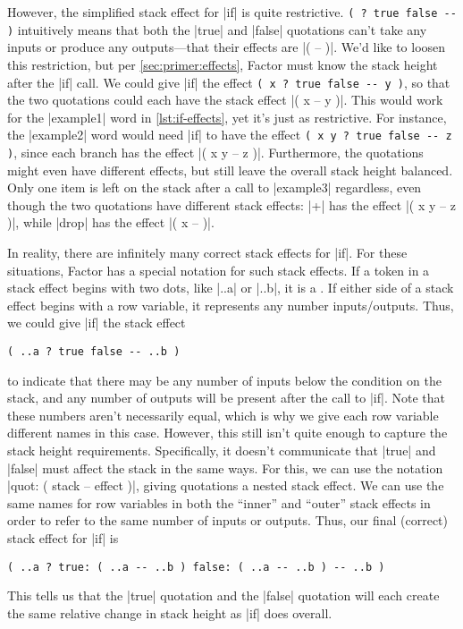 
However, the simplified stack effect for \factor|if| is quite restrictive.
%
\Verb|( ? true false -- )| 
%
intuitively means that both the \factor|true| and \factor|false| quotations
can't take any inputs or produce any outputs---that their effects are
%
\factor|( -- )|.
%
We'd like to loosen this restriction, but per \cref{sec:primer:effects}, Factor
must know the stack height after the \factor|if| call.  We could give
\factor|if| the effect
%
\Verb|( x ? true false -- y )|,
%
so that the two quotations could each have the stack effect
%
\factor|( x -- y )|.
%
This would work for the \factor|example1| word in \vref{lst:if-effects}, yet
it's just as restrictive.  For instance, the \factor|example2| word would need
\factor|if| to have the effect
%
\Verb|( x y ? true false -- z )|,
%
since each branch has the effect
%
\factor|( x y -- z )|.
%
Furthermore, the quotations might even have different effects, but still leave
the overall stack height balanced.  Only one item is left on the stack after a
call to \factor|example3| regardless, even though the two quotations have
different stack effects: \factor|+| has the effect
%
\factor|( x y -- z )|,
%
while \factor|drop| has the effect
%
\factor|( x -- )|.

In reality, there are infinitely many correct stack effects for \factor|if|.
For these situations, Factor has a special notation for such
 stack effects.  If a token in a stack effect begins with
two dots, like \factor|..a| or \factor|..b|, it is a .  If
either side of a stack effect begins with a row variable, it represents any
number inputs/outputs.  Thus, we could give \factor|if| the stack effect
%
\begin{center} \Verb|( ..a ? true false -- ..b )| \end{center}
%
\noindent to indicate that there may be any number of inputs below the
condition on the stack, and any number of outputs will be present after the
call to \factor|if|.  Note that these numbers aren't necessarily equal, which
is why we give each row variable different names in this case.  However, this
still isn't quite enough to capture the stack height requirements.
Specifically, it doesn't communicate that \factor|true| and \factor|false| must
affect the stack in the same ways.  For this, we can use the notation
%
\factor|quot: ( stack -- effect )|,
%
giving quotations a nested stack effect.  We can use the same names for row
variables in both the ``inner'' and ``outer'' stack effects in order to refer
to the same number of inputs or outputs.  Thus, our final (correct) stack
effect for \factor|if| is 
%
\begin{center}
%
  \Verb|( ..a ? true: ( ..a -- ..b ) false: ( ..a -- ..b ) -- ..b )|
%
\end{center}
%
\noindent This tells us that the \factor|true| quotation and the \factor|false|
quotation will each create the same relative change in stack height as
\factor|if| does overall.

